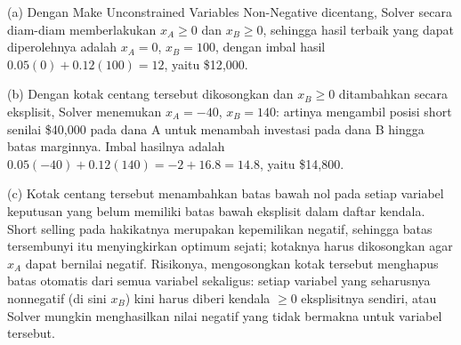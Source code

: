 (a) Dengan Make Unconstrained Variables Non-Negative dicentang, Solver secara diam-diam memberlakukan $x_A \geq 0$ dan $x_B \geq 0$, sehingga hasil terbaik yang dapat diperolehnya adalah $x_A = 0$, $x_B = 100$, dengan imbal hasil $0.05(0) + 0.12(100) = 12$, yaitu \$12{,}000.

(b) Dengan kotak centang tersebut dikosongkan dan $x_B \geq 0$ ditambahkan secara eksplisit, Solver menemukan $x_A = -40$, $x_B = 140$: artinya mengambil posisi short senilai \$40{,}000 pada dana A untuk menambah investasi pada dana B hingga batas marginnya. Imbal hasilnya adalah $0.05(-40) + 0.12(140) = -2 + 16.8 = 14.8$, yaitu \$14{,}800.

(c) Kotak centang tersebut menambahkan batas bawah nol pada setiap variabel keputusan yang belum memiliki batas bawah eksplisit dalam daftar kendala. Short selling pada hakikatnya merupakan kepemilikan negatif, sehingga batas tersembunyi itu menyingkirkan optimum sejati; kotaknya harus dikosongkan agar $x_A$ dapat bernilai negatif. Risikonya, mengosongkan kotak tersebut menghapus batas otomatis dari semua variabel sekaligus: setiap variabel yang seharusnya nonnegatif (di sini $x_B$) kini harus diberi kendala $\geq 0$ eksplisitnya sendiri, atau Solver mungkin menghasilkan nilai negatif yang tidak bermakna untuk variabel tersebut.
